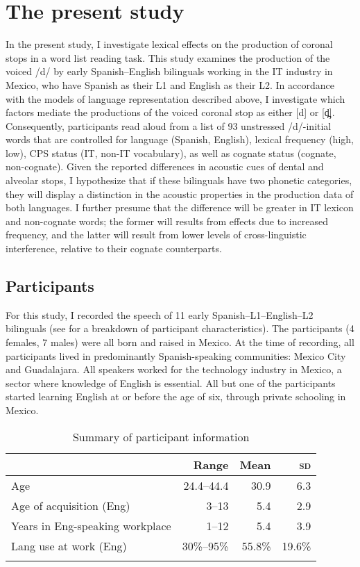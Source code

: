 \documentclass[output=paper,colorlinks,citecolor=brown,
]{langscibook}
\begin{document}
\section{The present study}\label{sec:gutierrez:study}

In the present study, I investigate lexical effects on the production of coronal stops in a word list reading task. This study examines the production of the voiced /d/ by early Spanish--English bilinguals working in the IT industry in Mexico, who have Spanish as their L1 and English as their L2. In accordance with the models of language representation described above, I investigate which factors mediate the productions of the voiced coronal stop as either [d] or [d̪]. Consequently, participants read aloud from a list of 93 unstressed /d/-initial words that are controlled for language (Spanish, English), lexical frequency (high, low), CPS status (IT, non-IT vocabulary), as well as cognate status (cognate, non-cognate). Given the reported differences in acoustic cues of dental and alveolar stops, I hypothesize that if these bilinguals have two phonetic categories, they will display a distinction in the acoustic properties in the production data of both languages. I further presume that the difference will be greater in IT lexicon and non-cognate words; the former will results from effects due to increased frequency, and the latter will result from lower levels of cross-linguistic interference, relative to their cognate counterparts.


\subsection{Participants}

For this study, I recorded the speech of 11 early Spanish--L1--English--L2 bilinguals (see  for a breakdown of participant characteristics). The participants (4 females, 7 males) were all born and raised in Mexico. At the time of recording, all participants lived in predominantly Spanish-speaking communities: Mexico City and Guadalajara. All speakers worked for the technology industry in Mexico, a sector where knowledge of English is essential. All but one of the participants started learning English at or before the age of six, through private schooling in Mexico.

\begin{table}
\caption{Summary of participant information}
\label{tab:gutierrez:participant_general}
 \begin{tabular}{lrrr}
 \lsptoprule
 & Range & Mean & \textsc{sd} \\
 \midrule
 Age & 24.4--44.4 & 30.9 & 6.3 \\
 Age of acquisition (Eng) & 3--13 & 5.4 & 2.9 \\
 Years in Eng-speaking workplace & 1--12 & 5.4 & 3.9 \\
 Lang use at work (Eng) & 30\%--95\% & 55.8\% & 19.6\% \\
 \lspbottomrule
 \end{tabular}
\end{table}
\end{document}
